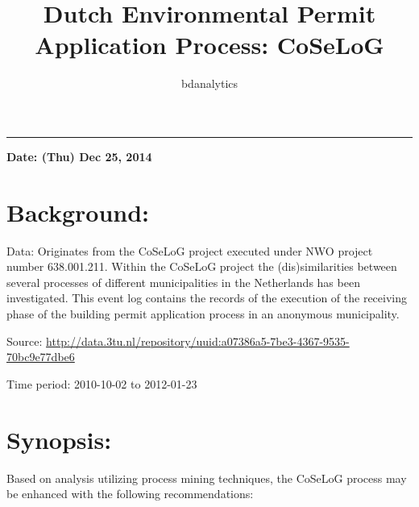 \documentclass[]{article}
\title{Dutch Environmental Permit Application Process: CoSeLoG}
\author{bdanalytics}
\date{}
\begin{document}
\maketitle


{
\hypersetup{linkcolor=black}
\setcounter{tocdepth}{2}
\tableofcontents
}
\begin{center}\rule{0.5\linewidth}{\linethickness}\end{center}

\textbf{Date: (Thu) Dec 25, 2014}

\section{Background:}\label{background}

Data: Originates from the CoSeLoG project executed under NWO project
number 638.001.211. Within the CoSeLoG project the (dis)similarities
between several processes of different municipalities in the Netherlands
has been investigated. This event log contains the records of the
execution of the receiving phase of the building permit application
process in an anonymous municipality.

Source:
\url{http://data.3tu.nl/repository/uuid:a07386a5-7be3-4367-9535-70bc9e77dbe6}

Time period: 2010-10-02 to 2012-01-23

\section{Synopsis:}\label{synopsis}

Based on analysis utilizing process mining techniques, the CoSeLoG
process may be enhanced with the following recommendations:
\end{document}
